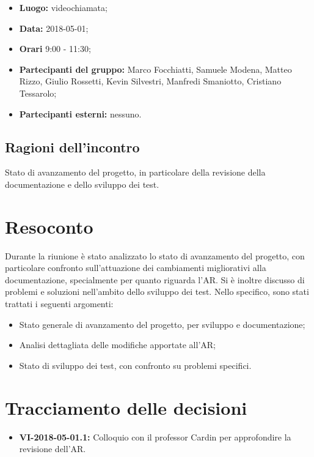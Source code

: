 \documentclass[openany,12pt,a4paper]{article}
\begin{document}
	\begin{itemize} 
	    \item \textbf{Luogo:} videochiamata;
	    \item \textbf{Data:} 2018-05-01;
	    \item \textbf{Orari} 9:00 - 11:30;
	    \item \textbf{Partecipanti del gruppo:} Marco Focchiatti, Samuele Modena, Matteo Rizzo, Giulio Rossetti, Kevin Silvestri, Manfredi Smaniotto, Cristiano Tessarolo;
	    \item \textbf{Partecipanti esterni:} nessuno.
	\end{itemize}
	
	\subsection{Ragioni dell'incontro}
	
	Stato di avanzamento del progetto, in particolare della revisione della documentazione e dello sviluppo dei test.

	\section{Resoconto}
	
	Durante la riunione è stato analizzato lo stato di avanzamento del progetto, con particolare confronto sull'attuazione dei cambiamenti migliorativi alla documentazione, specialmente per quanto riguarda l'AR. Si è inoltre discusso di problemi e soluzioni nell'ambito dello sviluppo dei test. Nello specifico, sono stati trattati i seguenti argomenti:
	
	\begin{itemize}
		\item Stato generale di avanzamento del progetto, per sviluppo e documentazione;
		\item Analisi dettagliata delle modifiche apportate all'AR;
		\item Stato di sviluppo dei test, con confronto su problemi specifici.
	\end{itemize}  
	
	\section{Tracciamento delle decisioni}
	
	\begin{itemize}
	    \item \textbf{VI-2018-05-01.1:} Colloquio con il professor Cardin per approfondire la revisione dell'AR.
	\end{itemize}	

	
\end{document}
